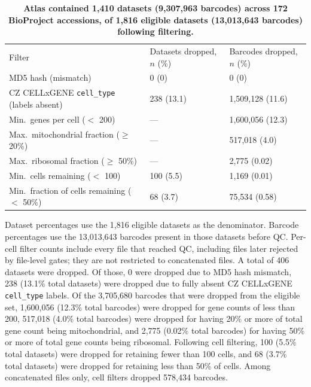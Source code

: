 \begin{table}[!ht]
\centering
\caption{\textbf{Atlas contained 1,410 datasets (9,307,963 barcodes) across 172 BioProject accessions, of 1,816 eligible datasets (13,013,643 barcodes) following filtering.}}
\begin{tabular}{|l|l|l|}
\hline
Filter & Datasets dropped, $n$ (\%) & Barcodes dropped, $n$ (\%)\\ \thickhline
MD5 hash (mismatch) & 0 (0) & 0 (0)\\ \hline
CZ CELLxGENE \texttt{cell_type} (labels absent) & 238 (13.1) & 1,509,128 (11.6)\\ \hline
Min.\ genes per cell ($<$ 200) & --- & 1,600,056 (12.3)\\ \hline
Max.\ mitochondrial fraction ($\geq$ 20\%) & --- & 517,018 (4.0)\\ \hline
Max.\ ribosomal fraction ($\geq$ 50\%) & --- & 2,775 (0.02)\\ \hline
Min.\ cells remaining ($<$ 100) & 100 (5.5) & 1,169 (0.01)\\ \hline
Min.\ fraction of cells remaining ($<$ 50\%) & 68 (3.7) & 75,534 (0.58)\\ \hline
\end{tabular}
\begin{flushleft} Dataset percentages use the 1,816 eligible datasets as the denominator. Barcode percentages use the 13,013,643 barcodes present in those datasets before QC. Per-cell filter counts include every file that reached QC, including files later rejected by file-level gates; they are not restricted to concatenated files. A total of 406 datasets were dropped. Of those, 0 were dropped due to MD5 hash mismatch, 238 (13.1\% total datasets) were dropped due to fully absent CZ CELLxGENE \texttt{cell_type} labels. Of the 3,705,680 barcodes that were dropped from the eligible set, 1,600,056 (12.3\% total barcodes) were dropped for gene counts of less than 200, 517,018 (4.0\% total barcodes) were dropped for having 20\% or more of total gene count being mitochondrial, and 2,775 (0.02\% total barcodes) for having 50\% or more of total gene counts being ribosomal. Following cell filtering, 100 (5.5\% total datasets) were dropped for retaining fewer than 100 cells, and 68 (3.7\% total datasets) were dropped for retaining less than 50\% of cells. Among concatenated files only, cell filters dropped 578,434 barcodes.
\end{flushleft}
\label{table1}
\end{table}
